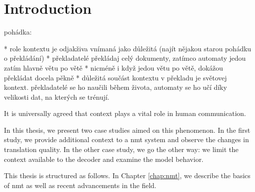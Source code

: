 \chapter{Introduction}
\label{chap:intro}

\begin{markdown}

pohádka:

* role kontextu je odjakživa vnímaná jako důležitá (najít nějakou starou pohádku o překládání)
* překladatelé překládaj celý dokumenty, zatímco automaty jedou zatím hlavně větu po větě
* nicméně i když jedou větu po větě, dokážou překládat docela pěkně
* důležitá součást kontextu v překladu je světovej kontext. překladatelé se ho naučili během života, automaty se ho učí díky velikosti dat, na kterých se trénují.

\end{markdown}


It is universally agreed that context plays a vital role in human communication.


In this thesis, we present two case studies aimed on this phenomenon. In the
first study, we provide additional context to a \gls{nmt} system and observe the
changes in translation quality. In the other case study, we go the other way: we
limit the context available to the decoder and examine the model behavior.

This thesis is structured as follows. In Chapter \ref{chap:nmt}, we describe the
basics of \gls{nmt} as well as recent advancements in the field. %


